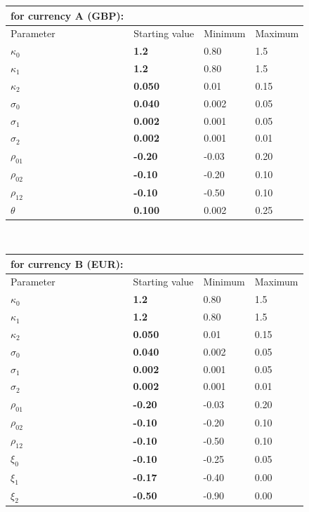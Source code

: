 \documentclass[10pt]{article}
\begin{document}
\begin{tabular}{ |l | l | l | l |}
\hline
for currency A (GBP):& & & \\
\hline
Parameter  &  Starting value & Minimum & Maximum \\
\hline
$\kappa_0$ & \textbf{1.2} & 0.80 & 1.5 \\
$\kappa_1$ & \textbf{1.2} & 0.80 & 1.5 \\
$\kappa_2$ & \textbf{0.050} & 0.01 & 0.15 \\
$\sigma_0$ & \textbf{0.040} & 0.002 & 0.05 \\
$\sigma_1$ & \textbf{0.002} & 0.001 & 0.05 \\
$\sigma_2$ & \textbf{0.002} & 0.001 & 0.01 \\
$\rho_{01}$& \textbf{-0.20} & -0.03 & 0.20 \\
$\rho_{02}$& \textbf{-0.10} & -0.20 & 0.10 \\
$\rho_{12}$& \textbf{-0.10} & -0.50 & 0.10  \\
$\theta   $& \textbf{0.100} & 0.002 & 0.25 \\
\hline
\end{tabular} \\

\begin{tabular}{ |l | l | l | l |}
\hline
for currency B (EUR):& & & \\
\hline
Parameter  &  Starting value & Minimum & Maximum \\
\hline
$\kappa_0$ & \textbf{1.2} & 0.80 & 1.5 \\
$\kappa_1$ & \textbf{1.2} & 0.80 & 1.5 \\
$\kappa_2$ & \textbf{0.050} & 0.01 & 0.15 \\
$\sigma_0$ & \textbf{0.040} & 0.002 & 0.05 \\
$\sigma_1$ & \textbf{0.002} & 0.001 & 0.05 \\
$\sigma_2$ & \textbf{0.002} & 0.001 & 0.01 \\
$\rho_{01}$& \textbf{-0.20} & -0.03 & 0.20 \\
$\rho_{02}$& \textbf{-0.10} & -0.20 & 0.10 \\
$\rho_{12}$& \textbf{-0.10} & -0.50 & 0.10  \\
$\xi_0$    & \textbf{-0.10} & -0.25 & 0.05 \\
$\xi_1$    & \textbf{-0.17} & -0.40 & 0.00 \\
$\xi_2$    & \textbf{-0.50} & -0.90 & 0.00 \\
\hline	
\end{tabular}
\\
\end{document}
